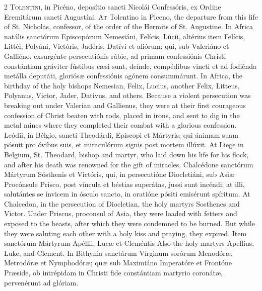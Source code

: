 \begin{paracol}{2}
\lettrine[lines=2]{T}{olentíni,} in Picéno, deposítio sancti Nicolái Confessóris, ex Ordine Eremitárum sancti Augustíni.
\switchcolumn
{}
\lettrine[lines=2]{A}{t} Tolentino in Piceno, the 
 departure from this life of St. Nicholas, confessor, of the order of the 
 Hermits of St. Augustine.
\switchcolumn*
{}
In Africa natális 
 sanctórum Episcopórum Nemesiáni, Felícis, Lúcii, altérius item Felícis, 
 Littéi, Polyáni, Victóris, Jadéris, Datívi et aliórum; qui, sub Valeriáno et 
 Galliéno, exsurgénte persecutiónis rábie, ad primam confessiónis Christi 
 constántiam gráviter fústibus cæsi sunt, deínde, compédibus vincti et ad 
 fodiénda metálla deputáti, gloriósæ confessiónis agónem consummárunt.
\switchcolumn
{}
In Africa, the birthday of the holy 
 bishops Nemesian, Felix, Lucius, another Felix, Litteus, Polyanus, Victor, 
 Jader, Dativus, and others. Because a violent persecution was breaking 
 out under Valerian and Gallienus, they were at their first courageous 
 confession of Christ beaten with rods, placed in irons, and sent to dig in 
 the metal mines where they completed their combat with a glorious 
 confession.
\switchcolumn*
{}
Leódii, in Bélgio, 
 sancti Theodárdi, Epíscopi et Mártyris; qui ánimam suam pósuit pro óvibus 
 suis, et miraculórum signis post mortem illúxit.
\switchcolumn
{}
At Liege in Belgium, St. Theodard, 
 bishop and martyr, who laid down his life for his flock, and after his death 
 was renowned for the gift of miracles.
\switchcolumn*
{}
Chalcédone sanctórum 
 Mártyrum Sósthenis et Victóris, qui, in persecutióne Diocletiáni, sub Asiæ 
 Procónsule Prisco, post víncula et béstias superátas, jussi sunt incéndi; at 
 illi, salutántes se ínvicem in ósculo sancto, in oratióne pósiti emisérunt 
 spíritum.
\switchcolumn
{}
At Chalcedon, in the persecution of 
 Diocletian, the holy martyrs Sosthenes and Victor. Under Priscus, 
 proconsul of Asia, they were loaded with fetters and exposed to the beasts, 
 after which they were condemned to be burned. But while they were 
 saluting each other with a holy kiss and praying, they expired.
\switchcolumn*
{}
Item sanctórum Mártyrum 
 Apéllii, Lucæ et Cleméntis
\switchcolumn
{}
Also the holy martyrs Apellius, 
 Luke, and Clement.
\switchcolumn*
{}
In Bithynia sanctárum Vírginum sorórum Menodóræ, Metrodóræ et Nymphodóræ; quæ sub Maximiáno Imperatóre et Frontóne Præside, ob intrépidam in Christi fide constántiam martyrio coronátæ, pervenérunt ad glóriam.

\end{paracol}
